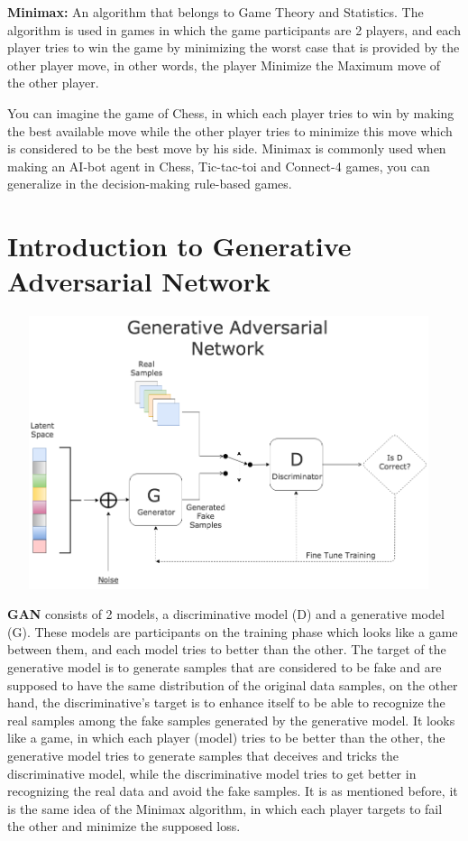 \documentclass{winnower}
\begin{document}
\textbf{Minimax:} An algorithm that belongs to Game Theory and Statistics. The algorithm is used in games in which the game participants are 2 players, and each player tries to win the game by minimizing the worst case that is provided by the other player move, in other words, the player Minimize the Maximum move of the other player.

You can imagine the game of Chess, in which each player tries to win by making the best available move while the other player tries to minimize this move which is considered to be the best move by his side. Minimax is commonly used when making an AI-bot agent in Chess, Tic-tac-toi and Connect-4 games, you can generalize in the decision-making rule-based games.


\section{Introduction to Generative Adversarial Network}
\begin{center}
  \includegraphics[width=13cm, height=8cm]{gan.png}
\end{center}

\textbf{GAN} consists of 2 models, a discriminative model (D) and a generative model (G). These models are participants on the training phase which looks like a game between them, and each model tries to better than the other. The target of the generative model is to generate samples that are considered to be fake and are supposed to have the same distribution of the original data samples, on the other hand, the discriminative’s target is to enhance itself to be able to recognize the real samples among the fake samples generated by the generative model. It looks like a game, in which each player (model) tries to be better than the other, the generative model tries to generate samples that deceives and tricks the discriminative model, while the discriminative model tries to get better in recognizing the real data and avoid the fake samples. It is as mentioned before, it is the same idea of the Minimax algorithm, in which each player targets to fail the other and minimize the supposed loss.\newline
\end{document}
